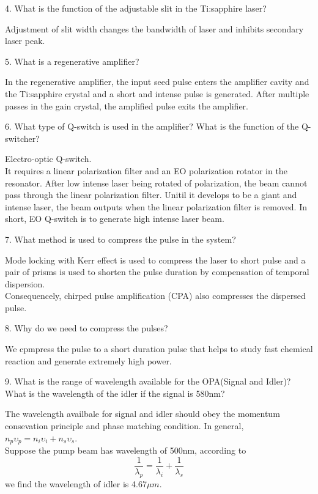 \documentclass{article}
\begin{document}
4. What is the function of the adjustable slit in the Ti:sapphire laser?
\par 
Adjustment of slit width changes the bandwidth of laser and inhibits secondary laser peak. \\
\par 
5. What is a regenerative amplifier?
\par 
In the regenerative amplifier, the input seed pulse enters the amplifier cavity and the Ti:sapphire crystal and a short and intense pulse is generated. After multiple passes in the gain crystal, the amplified pulse exits the amplifier.\\
\par 
6. What type of Q-switch is used in the amplifier? What is the function of the Q-switcher?
\par 
Electro-optic Q-switch.\\
It requires a linear polarization filter and an EO polarization rotator in the resonator. After low intense laser being rotated of polarization, the beam cannot pass through the linear polarization filter. Unitil it develops to be a giant and intense laser, the beam outputs when the linear polarization filter is removed. In short, EO Q-switch is to generate high intense laser beam.\\

\par 
7. What method is used to compress the pulse in the system?
\par 
Mode locking with Kerr effect is used to compress the laser to short pulse and a pair of prisms is used to shorten the pulse duration by compensation of temporal dispersion.\\
 Consequencely, chirped pulse amplification (CPA) also compresses the dispersed pulse. \\
\par 
8. Why do we need to compress the pulses?
\par 
We cpmpress the pulse to a short duration pulse that helps to study fast chemical reaction and generate extremely high power.\\
\par 
9. What is the range of wavelength available for the OPA(Signal and Idler)? What is the wavelength of the idler if the signal is 580nm?
\par 
The wavelength availbale for signal and idler should obey the momentum consevation principle and  phase matching condition. In general, $n_p\upsilon_p=n_i\upsilon_i+n_s\upsilon_s$.\\
Suppose the pump beam has wavelength of 500nm, according to
\begin{equation*}
\frac{1}{\lambda_p}=\frac{1}{\lambda_i}+\frac{1}{\lambda_s}
\end{equation*}
we find the wavelength of idler is 4.67$\mu m$.
\end{document}
